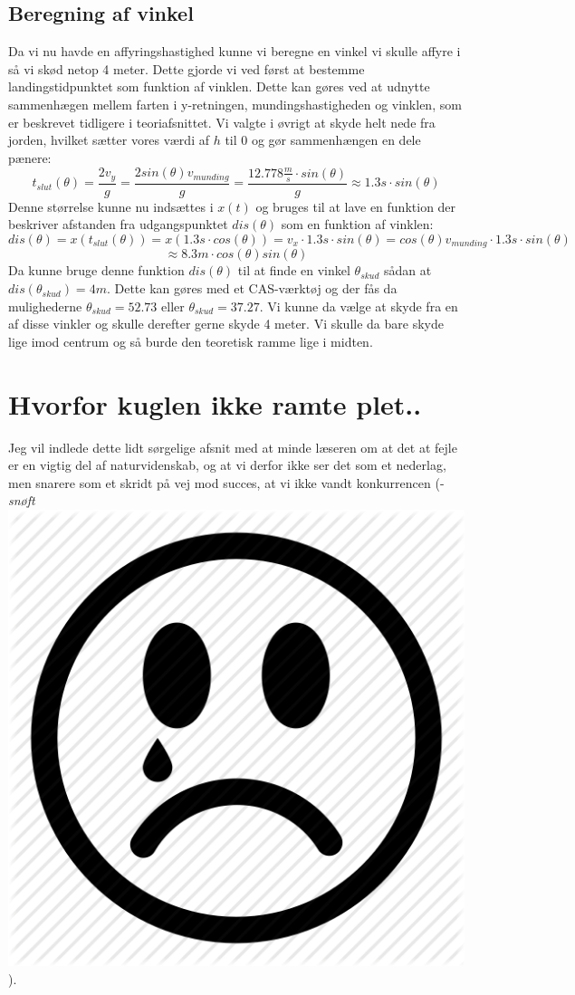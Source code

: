 \documentclass[12pt,a4paper]{article}
\theoremstyle{break}
\theoremstyle{nonumberplain}
\begin{document}
\subsection{Beregning af vinkel}
Da vi nu havde en affyringshastighed kunne vi beregne en vinkel vi skulle affyre i så vi skød netop 4 meter. 
Dette gjorde vi ved først at bestemme landingstidpunktet som funktion af vinklen. 
Dette kan gøres ved at udnytte sammenhægen mellem farten i y-retningen, mundingshastigheden og vinklen, som er beskrevet tidligere i teoriafsnittet. 
Vi valgte i øvrigt at skyde helt nede fra jorden, hvilket sætter vores værdi af $h$ til $0$ og gør sammenhængen en dele pænere:
$$t_{slut}(\theta)=\dfrac{2v_y}{g}=\dfrac{2sin(\theta )v_{munding}}{g}=\dfrac{12.778\frac{m}{s}\cdot sin(\theta )}{g}\approx 1.3 s \cdot sin(\theta)$$
Denne størrelse kunne nu indsættes i $x(t)$ og bruges til at lave en funktion der beskriver afstanden fra udgangspunktet $dis(\theta)$ som en funktion af vinklen: 
$$dis(\theta) = x(t_{slut}(\theta))=x(1.3 s \cdot cos(\theta))=v_x \cdot 1.3 s \cdot sin(\theta)=cos(\theta)v_{munding}\cdot 1.3 s \cdot sin(\theta)$$
$$\approx 8.3 m \cdot cos(\theta) sin(\theta)$$
Da kunne bruge denne funktion $dis(\theta)$ til at finde en vinkel $\theta_{skud}$ sådan at $dis(\theta_{skud})=4m$.
Dette kan gøres med et CAS-værktøj og der fås da mulighederne $\theta_{skud} = 52.73$ eller $\theta_{skud} = 37.27$.
Vi kunne da vælge at skyde fra en af disse vinkler og skulle derefter gerne skyde 4 meter. 
Vi skulle da bare skyde lige imod centrum og så burde den teoretisk ramme lige i midten.

\section{Hvorfor kuglen ikke ramte plet..}
Jeg vil indlede dette lidt sørgelige afsnit med at minde læseren om at det at fejle er en vigtig del af naturvidenskab, og at vi derfor ikke ser det som et nederlag, men snarere som et skridt på vej mod succes, at vi ikke vandt konkurrencen (- \textit{snøft} \includegraphics[scale=0.021]{sad}).
\end{document}
